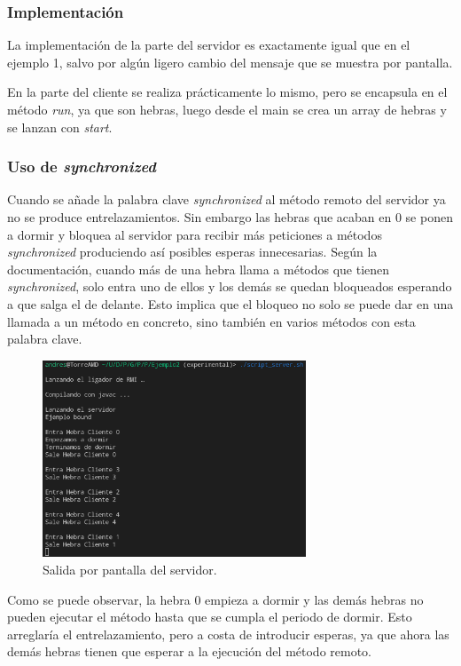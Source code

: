 \documentclass{article}
\begin{document}
\subsubsection{Implementación}
La implementación de la parte del servidor es exactamente igual que en el ejemplo 1, salvo por algún ligero cambio del mensaje que se muestra por pantalla.

En la parte del cliente se realiza prácticamente lo mismo, pero se encapsula en el método \textit{run}, ya que son hebras, luego desde el main se crea un array de hebras y se lanzan con \textit{start}.

\subsubsection{Uso de \textit{synchronized}}
Cuando se añade la palabra clave \textit{synchronized} al método remoto del servidor ya no se produce entrelazamientos. Sin embargo las hebras que acaban en 0 se ponen a dormir y bloquea al servidor para recibir más peticiones a métodos \textit{synchronized} produciendo así posibles esperas innecesarias. Según la documentación, cuando más de una hebra llama a métodos que tienen \textit{synchronized}, solo entra uno de ellos y los demás se quedan bloqueados esperando a que salga el de delante. Esto implica que el bloqueo no solo se puede dar en una llamada a un método en concreto, sino también en varios métodos con esta palabra clave.

\begin{figure}[H]
    \centering
    \includegraphics[width=0.7\textwidth]{imagenes/E2ServerSync1.png}
    \caption{Salida por pantalla del servidor.}
\end{figure}

Como se puede observar, la hebra 0 empieza a dormir y las demás hebras no pueden ejecutar el método hasta que se cumpla el periodo de dormir. Esto arreglaría el entrelazamiento, pero a costa de introducir esperas, ya que ahora las demás hebras tienen que esperar a la ejecución del método remoto.
\end{document}
